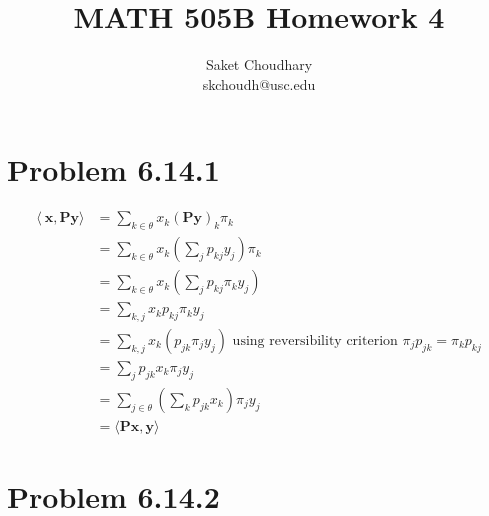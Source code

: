 \documentclass[a4paper]{article}
\title{MATH 505B Homework 4}
\author{Saket Choudhary\\skchoudh@usc.edu}
\begin{document}
\maketitle

\section*{Problem 6.14.1}

\begin{align*}
\langle\ \mathbf{x}, \mathbf{Py} \rangle &= \sum_{k\in \theta} x_k (\mathbf{Py})_k\pi_k \\
&= \sum_{k\in \theta} x_k (\sum_jp_{kj}y_j)\pi_k\\
&= \sum_{k\in \theta} x_k (\sum_jp_{kj}\pi_ky_j)\\
&= \sum_{k,j} x_k p_{kj}\pi_ky_j\\
&= \sum_{k,j} x_k (p_{jk}\pi_jy_j) \text{ using reversibility criterion  } \pi_jp_{jk} = \pi_kp_{kj}\\ 
&= \sum_{j} p_{jk}x_k \pi_jy_j\\
&= \sum_{j \in \theta} (\sum_k p_{jk}x_k) \pi_jy_j\\
&= \langle \mathbf{Px,y} \rangle
\end{align*}

\section*{Problem 6.14.2}
\end{document}

